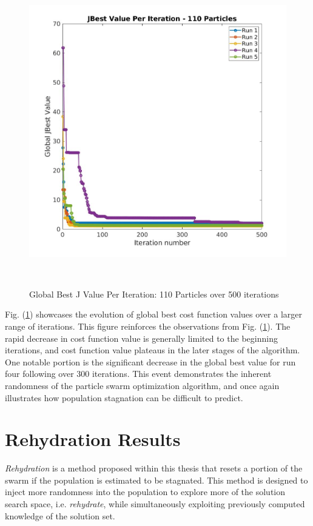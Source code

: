 \begin{figure}[H]
    \includegraphics[width=\linewidth, height=13.5cm]{./jpgs/i500.jpg}
    \caption{Global Best J Value Per Iteration: 110 Particles over 500 iterations}
    \label{fig:gBestPer500Iter}
    \end{figure}

\noindent Fig. (\ref{fig:gBestPer500Iter}) showcases the evolution of global best cost function values over a larger 
range of iterations. This figure reinforces the observations from Fig. (\ref{fig:gBestPer500Iter}). The rapid decrease 
in cost function value is generally limited to the beginning iterations, and cost function value
plateaus in the later stages of the algorithm. One notable portion is the significant decrease in the global best 
value for run four following over 300 iterations. This event demonstrates the inherent randomness of the particle swarm 
optimization algorithm, and once again illustrates how population stagnation can be difficult to predict.

\section{Rehydration Results}

\noindent \textit{Rehydration} is a method proposed within this thesis that resets a portion of the swarm if the population is estimated to 
be stagnated. This method is designed to inject more randomness into the population to explore more of the solution search space, 
i.e. \textit{rehydrate}, while
simultaneously exploiting previously computed knowledge of the solution set.

